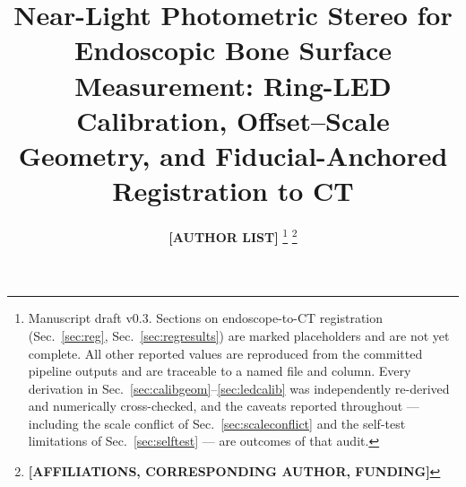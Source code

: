 \documentclass[journal,10pt]{IEEEtran}
\newcommand{\TODO}[1]{\textcolor{todoRed}{\textbf{[#1]}}}
\begin{document}
\title{Near-Light Photometric Stereo for Endoscopic Bone Surface Measurement:
Ring-LED Calibration, Offset--Scale Geometry, and Fiducial-Anchored
Registration to CT}

\author{\TODO{AUTHOR LIST}%
\thanks{Manuscript draft v0.3. Sections on endoscope-to-CT registration
(Sec.~\ref{sec:reg}, Sec.~\ref{sec:regresults}) are marked placeholders and are
not yet complete. All other reported values are reproduced from the committed
pipeline outputs and are traceable to a named file and column. Every derivation
in Sec.~\ref{sec:calibgeom}--\ref{sec:ledcalib} was independently re-derived and
numerically cross-checked, and the caveats reported throughout --- including the
scale conflict of Sec.~\ref{sec:scaleconflict} and the self-test limitations of
Sec.~\ref{sec:selftest} --- are outcomes of that audit.}%
\thanks{\TODO{AFFILIATIONS, CORRESPONDING AUTHOR, FUNDING}}}


\maketitle
\end{document}
